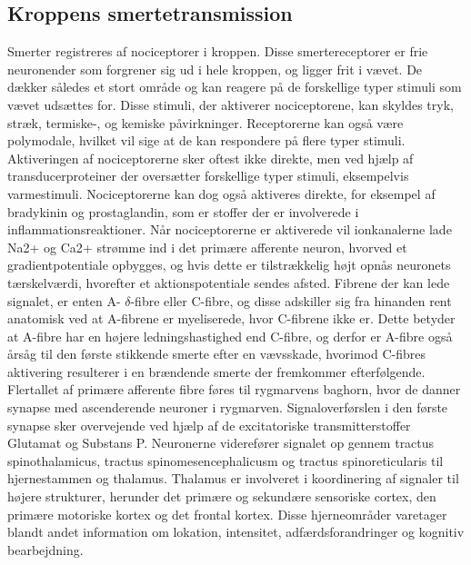 \subsection{Kroppens smertetransmission}
Smerter registreres af nociceptorer i kroppen. Disse smertereceptorer er frie neuronender som forgrener sig ud i hele kroppen, og ligger frit i vævet. De dækker således et stort område og kan reagere på de forskellige typer stimuli som vævet udsættes for. Disse stimuli, der aktiverer nociceptorene, kan skyldes tryk, stræk, termiske-, og kemiske påvirkninger. Receptorerne kan også være polymodale, hvilket vil sige at de kan respondere på flere typer stimuli. Aktiveringen af nociceptorerne sker oftest ikke direkte, men ved hjælp af transducerproteiner der oversætter forskellige typer stimuli, eksempelvis varmestimuli. Nociceptorerne kan dog også aktiveres direkte, for eksempel af bradykinin og prostaglandin, som er stoffer der er involverede i inflammationsreaktioner. \cite{smerter} Når nociceptorerne er aktiverede vil ionkanalerne lade Na2+ og Ca2+ strømme ind i det primære afferente neuron, hvorved et gradientpotentiale opbygges, og hvis dette er tilstrækkelig højt opnås neuronets tærskelværdi, hvorefter et aktionspotentiale sendes afsted. Fibrene der kan lede signalet, er enten A- $\delta$-fibre eller C-fibre, og disse adskiller sig fra hinanden rent anatomisk ved at A-fibrene er myeliserede, hvor C-fibrene ikke er. Dette betyder at A-fibre har en højere ledningshastighed end C-fibre, og derfor er A-fibre også årsåg til den første stikkende smerte efter en vævsskade, hvorimod C-fibres aktivering resulterer i en brændende smerte der fremkommer efterfølgende. 
Flertallet af primære afferente fibre føres til rygmarvens baghorn, hvor de danner synapse med ascenderende neuroner i rygmarven. Signaloverførslen i den første synapse sker overvejende ved hjælp af de excitatoriske transmitterstoffer Glutamat og Substans P. 
Neuronerne viderefører signalet op gennem tractus spinothalamicus, tractus spinomesencephalicusm og tractus spinoreticularis til hjernestammen og thalamus. Thalamus er involveret i koordinering af signaler til højere strukturer, herunder det primære og sekundære sensoriske cortex, den primære motoriske kortex og det frontal kortex. Disse hjerneområder varetager blandt andet information om lokation, intensitet, adfærdsforandringer og  kognitiv bearbejdning. 
